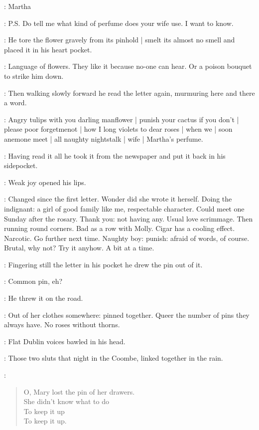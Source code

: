 \martha:
Martha

\martha:
P.S. Do tell me what kind of perfume does your wife use.
I want to know.

:
He tore the flower gravely from its pinhold |
smelt its almost no smell
and placed it in his heart pocket.

\BloomInt:
Language of flowers.
They like it
because no-one can hear.
Or a poison bouquet to strike him down.

:
Then walking slowly forward
he read the letter again,
murmuring here and there a word.

\BloomInt:
Angry tulips with you darling manflower |
punish your cactus if you don't |
please poor forgetmenot |
how I long violets to dear roses |
when we |
soon anemone meet |
all naughty nightstalk |
wife |
Martha's perfume.

:
Having read it all
he took it from the newspaper and put it back in his sidepocket.

:
Weak joy opened his lips.

\BloomInt:
Changed since the first letter.
Wonder did she wrote it herself.
Doing the indignant:
a girl of good family like me, respectable character.
Could meet one Sunday after the rosary.
Thank you: not having any.
Usual love scrimmage.
Then running round corners.
Bad as a row with Molly.
Cigar has a cooling effect.
Narcotic.
Go further next time.
Naughty boy:
punish:
afraid of words, of course.
Brutal, why not?
Try it anyhow.
A bit at a time.

:
Fingering still the letter in his pocket
he drew the pin out of it.

\BloomInt:
Common pin, eh?

:
He threw it on the road.

\BloomInt:
Out of her clothes somewhere:
pinned together.
Queer the number of pins they always have.
No roses without thorns.

:
Flat Dublin voices bawled in his head.

\BloomInt:
Those two sluts that night in the Coombe,
linked together in the rain.

\sluts:
\begin{verse}
    O, Mary lost the pin of her drawers. \\
    She didn't know what to do \\
    To keep it up \\
    To keep it up.
\end{verse}

